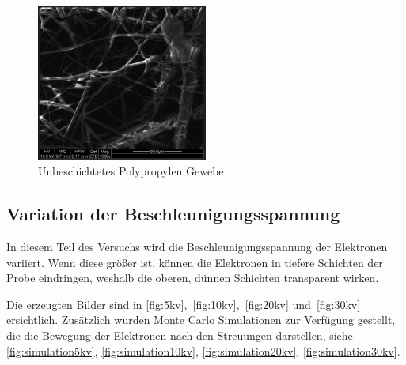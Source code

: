 \documentclass[12pt,english,ngerman]{scrartcl}
\begin{document}
\begin{figure}[H]
	\begin{center}
		\includegraphics[width =0.5\textwidth]{./figures/unbedampft.png}
	\end{center}
	\caption{Unbeschichtetes Polypropylen Gewebe
	}\label{fig:unbeschichtet}
\end{figure}

\subsection{Variation der Beschleunigungsspannung}

In diesem Teil des Versuchs wird die Beschleunigungsspannung der Elektronen
variiert. Wenn diese größer ist, können die Elektronen in tiefere Schichten der
Probe eindringen, weshalb die oberen, dünnen Schichten transparent wirken.

Die erzeugten Bilder sind in \autoref{fig:5kv},~\ref{fig:10kv},~\ref{fig:20kv}
und~\ref{fig:30kv} ersichtlich. Zusätzlich wurden Monte Carlo Simulationen zur
Verfügung gestellt, die die Bewegung der Elektronen nach den Streuungen
darstellen, siehe \autoref{fig:simulation5kv}, \autoref{fig:simulation10kv},
\autoref{fig:simulation20kv}, \autoref{fig:simulation30kv}.
\end{document}
